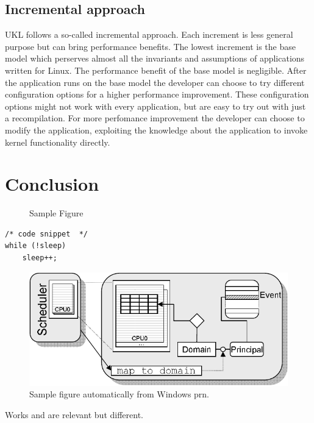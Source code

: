 \documentclass[10pt,twocolumn,a4paper]{article}
\begin{document}
  \subsection{Incremental approach}
    UKL follows a so-called incremental approach. 
    Each increment is less general purpose but can bring performance benefits.
    The lowest increment is the base model which perserves almost all the 
    invariants and assumptions of applications written for Linux.
    The performance benefit of the base model is negligible.
    After the application runs on the base model the developer can choose to try different
    configuration options for a higher performance improvement.
    These configuration options might not work with every application, but are easy to try out
    with just a recompilation.
    For more perfomance improvement the developer can choose to modify the application, exploiting the
    knowledge about the application to invoke kernel functionality directly.


\section{Conclusion}\label{sec:conclusion}






\begin{figure}[htbp]
  \centering
  \caption{Sample Figure}
  \label{fig:sample}
\end{figure}


\begin{lstlisting}
/* code snippet  */
while (!sleep)
	sleep++;
\end{lstlisting}

\begin{figure}[hbt]
\centering
\includegraphics[scale=.7,clip]{fig/template}
\caption{Sample figure automatically from Windows prn.\label{plot:fig}}
\end{figure}


Works \cite{xen03virtualization} and \cite{pratt2005xaa} are relevant but
different.




\end{document}
